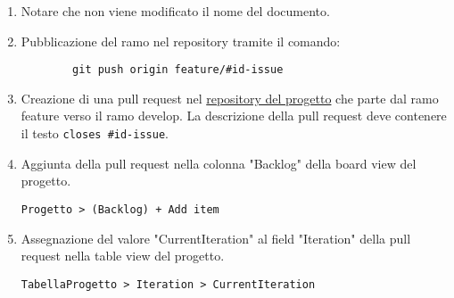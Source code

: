 \documentclass[a4paper, 12pt]{article}
\begin{document}
\begin{enumerate}
    \item Notare che non viene modificato il nome del documento.

    \item Pubblicazione del ramo nel repository tramite il comando:
    \begin{lstlisting}
        git push origin feature/#id-issue
    \end{lstlisting}

    \item Creazione di una pull request nel \href{https://github.com/ALT-F4-eng/SorgentiDocumentazione}{repository del progetto} che parte dal ramo feature verso il ramo develop.
    La descrizione della pull request deve contenere il testo \lstinline|closes #id-issue|.

    \item Aggiunta della pull request nella colonna "Backlog" della board view del progetto.
        
    \lstinline|Progetto > (Backlog) + Add item|
    
    \item Assegnazione del valore "CurrentIteration" al field "Iteration" della pull request nella table view del progetto.
    
    \lstinline|TabellaProgetto > Iteration > CurrentIteration|

\end{enumerate}
\end{document}
